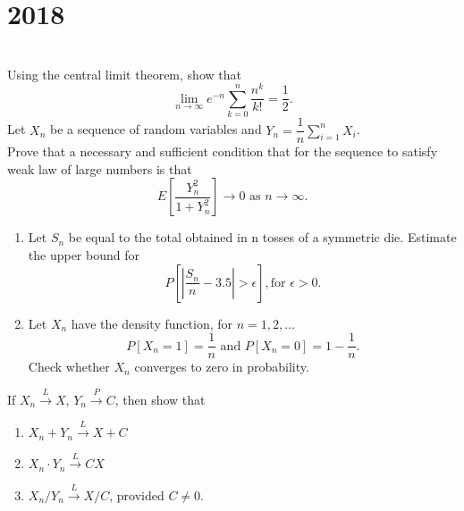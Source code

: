 \section*{2018}
\vspace{-.5cm}
\hrulefill \smallskip\\
 Using the central limit theorem, show that
\[\lim_{n\to\infty} e^{-n} \sum_{k=0}^{n} \dfrac{n^k}{k!} = \dfrac{1}{2}. \]
 Let ${X_n}$ be a sequence of random variables and $Y_n = \dfrac{1}{n}\sum_{i=1}^{n}X_i$.\\ Prove that a necessary and sufficient condition that for the sequence to satisfy weak law of large numbers is that
\[E\left[\dfrac{Y_n^2}{1 + Y_n^2}\right] \to 0 \text{ as } n \to \infty. \]
 \begin{enumerate}[topsep=0pt, itemsep = -1ex,label=(\roman*)]
    \item Let $S_n$ be equal to the total obtained in n tosses of a symmetric die. Estimate the upper bound for \[P\left[\left| \dfrac{S_n}{n} - 3.5 \right|>\epsilon\right], \text{for }\epsilon>0.\]
    \item Let $X_n$  have the density function, for $n=1,2,\ldots$ \[P[X_n = 1] = \dfrac{1}{n} \text{ and }P[X_n = 0] = 1 - \dfrac{1}{n}. \] Check whether $X_n$ converges to zero in probability.
\end{enumerate}
\vspace{0.25cm}
 If $X_n \xrightarrow{L} X$, $Y_n \xrightarrow{P} C $, then show that
\begin{enumerate}[topsep=0pt, itemsep = -1ex,label=(\roman*)]
    \item $X_n+Y_n\xrightarrow{L}X+C$
    \item $X_n \cdot Y_n\xrightarrow{L}CX$
    \item $X_n/Y_n\xrightarrow{L}X/C$, provided $C \neq 0.$
\end{enumerate}


